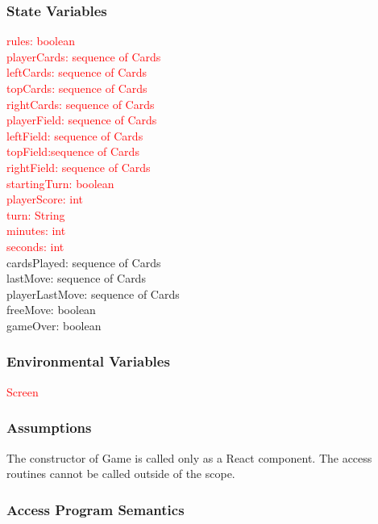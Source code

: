 \documentclass[12pt, titlepage]{article}
\begin{document}
\subsubsection{State Variables}
\textcolor{red}{
rules: boolean\\
playerCards: sequence of Cards\\
leftCards: sequence of Cards\\
topCards: sequence of Cards\\
rightCards: sequence of Cards\\
playerField: sequence of Cards\\
leftField: sequence of Cards\\
topField:sequence of Cards\\
rightField: sequence of Cards\\
startingTurn: boolean\\
playerScore: int\\
turn: String\\ 
minutes: int\\
seconds: int\\
}
cardsPlayed: sequence of Cards \\
lastMove: sequence of Cards \\
playerLastMove: sequence of Cards \\
freeMove: boolean\\
gameOver: boolean\\




\subsubsection{Environmental Variables}
\textcolor{red}{Screen}

\subsubsection{Assumptions}
The constructor of Game is called only as a React component. The access routines cannot be called outside of the scope. 
\subsubsection{Access Program Semantics} 
\end{document}
